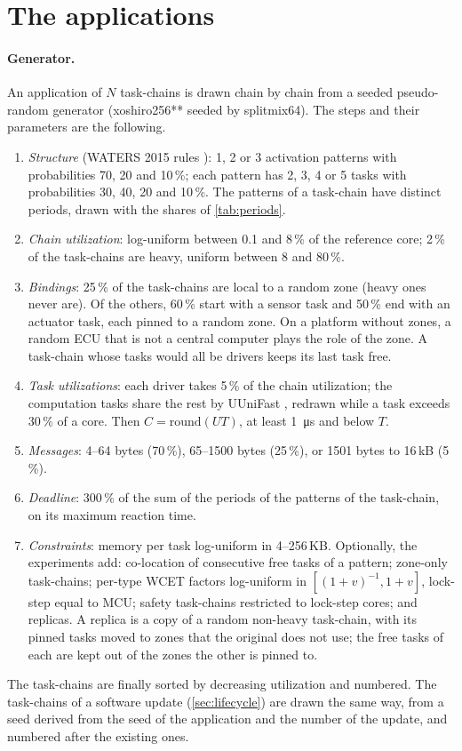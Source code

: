 \section{The applications}
\label{app:generator}

\paragraph{Generator.} An application of $N$ task-chains is drawn chain by
chain from a seeded pseudo-random generator (xoshiro256** seeded by
splitmix64). The steps and their parameters are the following.
\begin{enumerate}
\item \emph{Structure} (WATERS 2015 rules \cite{kramer2015waters}): 1, 2 or
3 activation patterns with probabilities 70, 20 and 10\,\%; each pattern
has 2, 3, 4 or 5 tasks with probabilities 30, 40, 20 and 10\,\%. The
patterns of a task-chain have distinct periods, drawn with the shares of
\cref{tab:periods}.
\item \emph{Chain utilization}: log-uniform between 0.1 and 8\,\% of the
reference core; 2\,\% of the task-chains are heavy, uniform between 8 and
80\,\%.
\item \emph{Bindings}: 25\,\% of the task-chains are local to a random zone
(heavy ones never are). Of the others, 60\,\% start with a sensor task and
50\,\% end with an actuator task, each pinned to a random zone. On a
platform without zones, a random ECU that is not a central computer plays
the role of the zone. A
task-chain whose tasks would all be drivers keeps its last task free.
\item \emph{Task utilizations}: each driver takes 5\,\% of the chain
utilization; the computation tasks share the rest by UUniFast
\cite{bini2005measuring}, redrawn while a task exceeds 30\,\% of a core.
Then $C=\mathrm{round}(UT)$, at least \SI{1}{\micro s} and below $T$.
\item \emph{Messages}: 4--64 bytes (70\,\%), 65--1500 bytes (25\,\%), or
1501 bytes to 16\,kB (5\,\%).
\item \emph{Deadline}: 300\,\% of the sum of the periods of the patterns of
the task-chain, on its maximum reaction time.
\item \emph{Constraints}: memory per task log-uniform in 4--256\,KB.
Optionally, the experiments add: co-location of consecutive free tasks of
a pattern; zone-only task-chains; per-type WCET factors log-uniform in
$[(1+v)^{-1},1+v]$, lock-step equal to MCU; safety task-chains restricted to
lock-step cores; and replicas. A replica is a copy of a random non-heavy
task-chain, with its pinned tasks moved to zones that the original does
not use; the free tasks of each are kept out of the zones the other is
pinned to.
\end{enumerate}
The task-chains are finally sorted by decreasing utilization and numbered.
The task-chains of a software update (\cref{sec:lifecycle}) are drawn the
same way, from a seed derived from the seed of the application and the
number of the update, and numbered after the existing ones.

